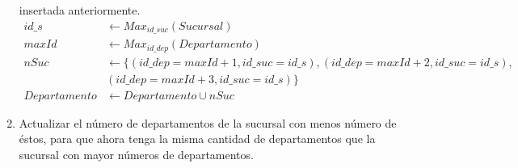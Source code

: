 \documentclass{article}
\begin{document}
\begin{enumerate}
{            insertada anteriormente.
            \begin{align*}
                id\_s &\leftarrow Max_{id\_suc}(Sucursal)\\
                maxId &\leftarrow Max_{id\_dep}(Departamento)\\
                nSuc &\leftarrow \{(id\_dep = maxId+1, id\_suc=id\_s),
                (id\_dep = maxId+2, id\_suc=id\_s),\\
                &(id\_dep = maxId+3, id\_suc=id\_s)\}\\
                Departamento &\leftarrow Departamento \cup nSuc
            \end{align*}
        }
        \item {
            Actualizar el número de departamentos de la sucursal con menos
            número de éstos, para que ahora tenga la misma cantidad de departamentos
            que la sucursal con mayor números de departamentos.
        }
    \end{enumerate}
\end{document}
